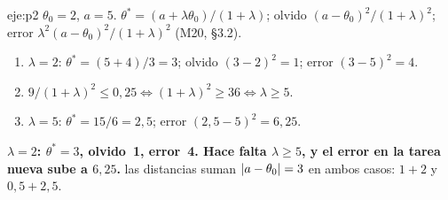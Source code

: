 \begin{solucion}{eje:p2}
\datos $\theta_0=2$, $a=5$.
\planteamiento $\theta^{\ast}=(a+\lambda\theta_0)/(1+\lambda)$; olvido $(a-\theta_0)^{2}/(1+\lambda)^{2}$; error $\lambda^{2}(a-\theta_0)^{2}/(1+\lambda)^{2}$ (M20, §3.2).
\pasos
\begin{enumerate}[label=\arabic*.]
  \item $\lambda=2$: $\theta^{\ast}=(5+4)/3=3$; olvido $(3-2)^{2}=1$; error $(3-5)^{2}=4$.
  \item $9/(1+\lambda)^{2}\le 0{,}25\iff(1+\lambda)^{2}\ge 36\iff\lambda\ge 5$.
  \item $\lambda=5$: $\theta^{\ast}=15/6=2{,}5$; error $(2{,}5-5)^{2}=6{,}25$.
\end{enumerate}
\resultado \textbf{$\lambda=2$: $\theta^{\ast}=3$, olvido~1, error~4. Hace falta $\lambda\ge 5$, y el error en la tarea nueva sube a $6{,}25$.}
\comprobacion las distancias suman $\lvert a-\theta_0\rvert=3$ en ambos casos: $1+2$ y $0{,}5+2{,}5$.
\end{solucion}


